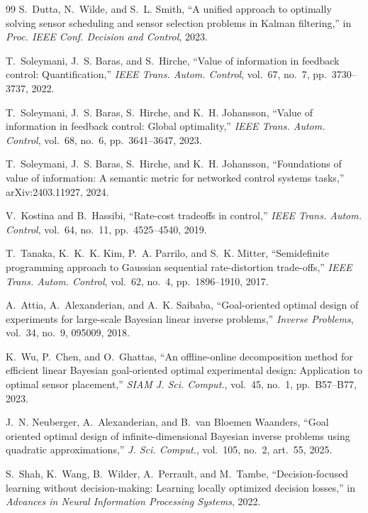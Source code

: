 \documentclass[letterpaper,onecolumn]{IEEEtran}
\theoremstyle{definition}
\theoremstyle{remark}
\begin{document}
\begin{thebibliography}{99}
 S.~Dutta, N.~Wilde, and S.~L. Smith, ``A unified
approach to optimally solving sensor scheduling and sensor selection
problems in Kalman filtering,'' in \emph{Proc. IEEE Conf. Decision and
Control}, 2023.

 T.~Soleymani, J.~S. Baras, and S.~Hirche, ``Value of
information in feedback control: Quantification,'' \emph{IEEE Trans. Autom.
Control}, vol.~67, no.~7, pp.~3730--3737, 2022.

 T.~Soleymani, J.~S. Baras, S.~Hirche, and K.~H.
Johansson, ``Value of information in feedback control: Global optimality,''
\emph{IEEE Trans. Autom. Control}, vol.~68, no.~6, pp.~3641--3647, 2023.

 T.~Soleymani, J.~S. Baras, S.~Hirche, and K.~H.
Johansson, ``Foundations of value of information: A semantic metric for
networked control systems tasks,'' arXiv:2403.11927, 2024.

 V.~Kostina and B.~Hassibi, ``Rate-cost tradeoffs in
control,'' \emph{IEEE Trans. Autom. Control}, vol.~64, no.~11,
pp.~4525--4540, 2019.

 T.~Tanaka, K.~K.~K. Kim, P.~A. Parrilo, and S.~K.
Mitter, ``Semidefinite programming approach to Gaussian sequential
rate-distortion trade-offs,'' \emph{IEEE Trans. Autom. Control}, vol.~62,
no.~4, pp.~1896--1910, 2017.

 A.~Attia, A.~Alexanderian, and A.~K. Saibaba,
``Goal-oriented optimal design of experiments for large-scale Bayesian linear
inverse problems,'' \emph{Inverse Problems}, vol.~34, no.~9, 095009, 2018.

 K.~Wu, P.~Chen, and O.~Ghattas, ``An offline-online
decomposition method for efficient linear Bayesian goal-oriented optimal
experimental design: Application to optimal sensor placement,'' \emph{SIAM
J. Sci. Comput.}, vol.~45, no.~1, pp.~B57--B77, 2023.

 J.~N. Neuberger, A.~Alexanderian, and B.~van
Bloemen Waanders, ``Goal oriented optimal design of infinite-dimensional
Bayesian inverse problems using quadratic approximations,'' \emph{J. Sci.
Comput.}, vol.~105, no.~2, art.~55, 2025.

 S.~Shah, K.~Wang, B.~Wilder, A.~Perrault, and M.~Tambe,
``Decision-focused learning without decision-making: Learning locally
optimized decision losses,'' in \emph{Advances in Neural Information
Processing Systems}, 2022.


\end{thebibliography}
\end{document}

